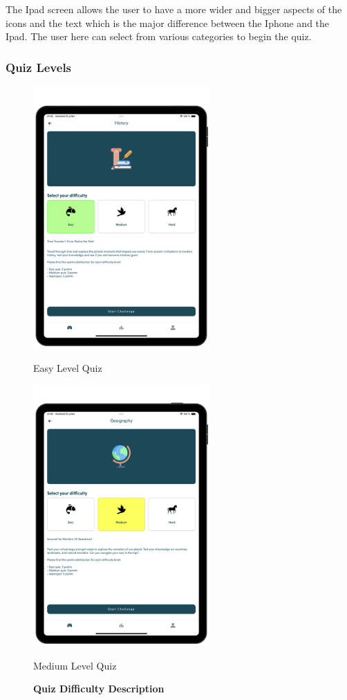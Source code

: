 The Ipad screen allows the user to have a more wider and bigger aspects of the icons and the text which is the major difference between the Iphone and the Ipad. The user here can select from various categories to begin the quiz.

\subsubsection{Quiz Levels}

\begin{figure}[H]
    \centering
    \begin{minipage}[b]{0.43\linewidth}
        \centering
        \includegraphics[height=10cm]{TabletUI/Easy Level Quiz.png}
        \caption{Easy Level Quiz}
    \end{minipage}
    \hspace{0.1\linewidth}
    \begin{minipage}[b]{0.43\linewidth}
        \centering
        \includegraphics[height=10cm]{TabletUI/Medium Level Quiz.png}
        \caption{Medium Level Quiz}
    \end{minipage}
    \vspace{0.5cm}
    \caption{\textbf{Quiz Difficulty Description}}
\end{figure}

